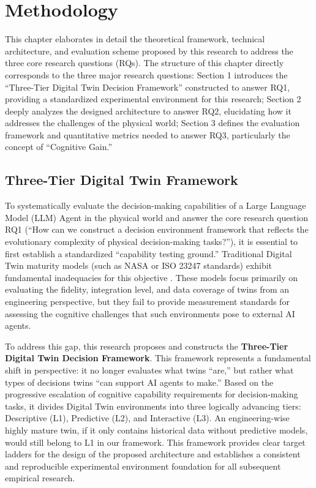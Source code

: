 
\chapter{Methodology} \label{chp:methodology}

This chapter elaborates in detail the theoretical framework, technical architecture, and evaluation scheme proposed by this research to address the three core research questions (RQs). The structure of this chapter directly corresponds to the three major research questions: Section 1 introduces the ``Three-Tier Digital Twin Decision Framework'' constructed to answer RQ1, providing a standardized experimental environment for this research; Section 2 deeply analyzes the designed architecture to answer RQ2, elucidating how it addresses the challenges of the physical world; Section 3 defines the evaluation framework and quantitative metrics needed to answer RQ3, particularly the concept of ``Cognitive Gain.''

\section{Three-Tier Digital Twin Framework}

To systematically evaluate the decision-making capabilities of a Large Language Model (LLM) Agent in the physical world and answer the core research question RQ1 (``How can we construct a decision environment framework that reflects the evolutionary complexity of physical decision-making tasks?''), it is essential to first establish a standardized ``capability testing ground.'' Traditional Digital Twin maturity models (such as NASA or ISO 23247 standards) exhibit fundamental inadequacies for this objective \cite{glaessgen2012digital, ISO23247}. These models focus primarily on evaluating the fidelity, integration level, and data coverage of twins from an engineering perspective, but they fail to provide measurement standards for assessing the cognitive challenges that such environments pose to external AI agents.

To address this gap, this research proposes and constructs the \textbf{Three-Tier Digital Twin Decision Framework}. This framework represents a fundamental shift in perspective: it no longer evaluates what twins ``are,'' but rather what types of decisions twins ``can support AI agents to make.'' Based on the progressive escalation of cognitive capability requirements for decision-making tasks, it divides Digital Twin environments into three logically advancing tiers: Descriptive (L1), Predictive (L2), and Interactive (L3). An engineering-wise highly mature twin, if it only contains historical data without predictive models, would still belong to L1 in our framework. This framework provides clear target ladders for the design of the proposed architecture and establishes a consistent and reproducible experimental environment foundation for all subsequent empirical research.

